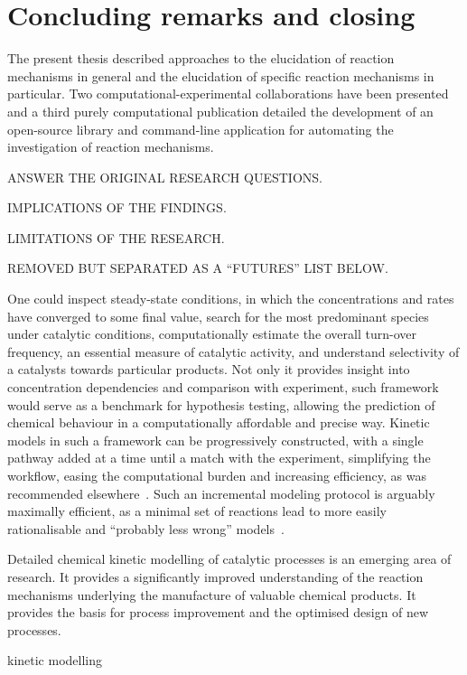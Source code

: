 \chapter{Concluding remarks and closing}%
\label{ch:conclusion}

The present thesis described approaches to the elucidation of reaction
mechanisms in general and the elucidation of specific reaction mechanisms in
particular.
Two computational-experimental collaborations have been presented and a third
purely computational publication detailed the development of an open-source
library and command-line application for automating the investigation of
reaction mechanisms.

ANSWER THE ORIGINAL RESEARCH QUESTIONS.\@

IMPLICATIONS OF THE FINDINGS.\@

LIMITATIONS OF THE RESEARCH.\@

REMOVED BUT SEPARATED AS A ``FUTURES'' LIST BELOW\@.

One could inspect steady-state conditions, in which the concentrations and rates have converged to some final value, search for the most predominant species under catalytic conditions, computationally estimate the overall turn-over frequency, an essential measure of catalytic activity, and understand selectivity of a catalysts towards particular products.
Not only it provides insight into concentration dependencies and comparison with experiment, such framework would serve as a benchmark for hypothesis testing, allowing the prediction of chemical behaviour in a computationally affordable and precise way.
Kinetic models in such a framework can be progressively constructed, with a single pathway added at a time until a match with the experiment, simplifying the workflow, easing the computational burden and increasing efficiency, as was recommended elsewhere~\cite{Jara_z_2019}.
Such an incremental modeling protocol is arguably maximally efficient, as a
minimal set of reactions lead to more easily rationalisable and
``probably less wrong'' models~\cite{Blackmond_2015,Jara_z_2019}.

Detailed chemical kinetic modelling of catalytic processes is an emerging area of research. It provides a significantly improved understanding of the reaction mechanisms underlying the manufacture of valuable chemical products. It provides the basis for process improvement and the optimised design of new processes.

kinetic modelling

